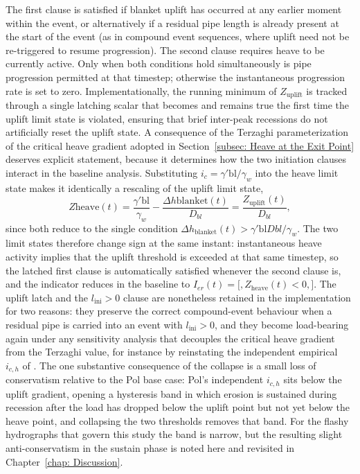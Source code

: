 The first clause is satisfied if blanket uplift has occurred at any earlier moment within the event, or alternatively if a residual pipe length is already present at the start of the event (as in compound event sequences, where uplift need not be re-triggered to resume progression). The second clause requires heave to be currently active. Only when both conditions hold simultaneously is pipe progression permitted at that timestep; otherwise the instantaneous progression rate is set to zero. Implementationally, the running minimum of $Z_\mathrm{uplift}$ is tracked through a single latching scalar that becomes and remains true the first time the uplift limit state is violated, ensuring that brief inter-peak recessions do not artificially reset the uplift state. A consequence of the Terzaghi parameterization of the critical heave gradient adopted in Section~\ref{subsec: Heave at the Exit Point} deserves explicit statement, because it determines how the two initiation clauses interact in the baseline analysis. Substituting $i_c = \gamma'\mathrm{bl}/\gamma_w$ into the heave limit state makes it identically a rescaling of the uplift limit state,
$$Z\mathrm{heave}(t) = \frac{\gamma'\mathrm{bl}}{\gamma_w} - \frac{\Delta h\mathrm{blanket}(t)}{D_{bl}} = \frac{Z_\mathrm{uplift}(t)}{D_{bl}},$$
since both reduce to the single condition $\Delta h_\mathrm{blanket}(t) > \gamma'\mathrm{bl} D{bl}/\gamma_w$. The two limit states therefore change sign at the same instant: instantaneous heave activity implies that the uplift threshold is exceeded at that same timestep, so the latched first clause is automatically satisfied whenever the second clause is, and the indicator reduces in the baseline to $I_{er}(t) = \bigl[,Z_\mathrm{heave}(t) < 0,\bigr]$. The uplift latch and the $l_\mathrm{ini} > 0$ clause are nonetheless retained in the implementation for two reasons: they preserve the correct compound-event behaviour when a residual pipe is carried into an event with $l_\mathrm{ini} > 0$, and they become load-bearing again under any sensitivity analysis that decouples the critical heave gradient from the Terzaghi value, for instance by reinstating the independent empirical $i_{c,h}$ of \textcite{pol_sie_2024}. The one substantive consequence of the collapse is a small loss of conservatism relative to the Pol base case: Pol's independent $i_{c,h}$ sits below the uplift gradient, opening a hysteresis band in which erosion is sustained during recession after the load has dropped below the uplift point but not yet below the heave point, and collapsing the two thresholds removes that band. For the flashy hydrographs that govern this study the band is narrow, but the resulting slight anti-conservatism in the sustain phase is noted here and revisited in Chapter~\ref{chap: Discussion}.

